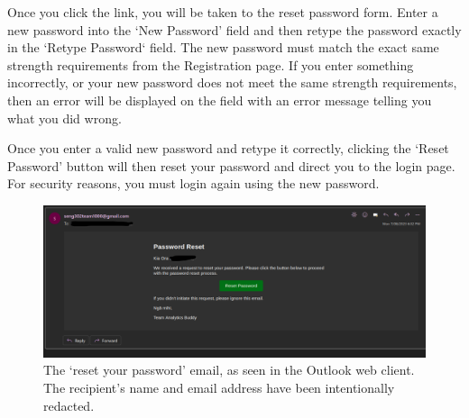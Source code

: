 \documentclass{article}
\begin{document}
    Once you click the link, you will be taken to the reset password form. Enter a new password into the `New Password' field and then retype the password exactly in the `Retype Password` field. The new password must match the exact same strength requirements from the Registration page. If you enter something incorrectly, or your new password does not meet the same strength requirements, then an error will be displayed on the field with an error message telling you what you did wrong.

    Once you enter a valid new password and retype it correctly, clicking the `Reset Password' button will then reset your password and direct you to the login page. For security reasons, you must login again using the new password.

    \begin{figure}
        \centering
        \includegraphics[width=\textwidth]{./password_reset_email.png}
        \caption{The `reset your password' email, as seen in the Outlook web client. The recipient's name and email address have been intentionally redacted.}
        \label{fig:password_reset}
    \end{figure}
\end{document}

